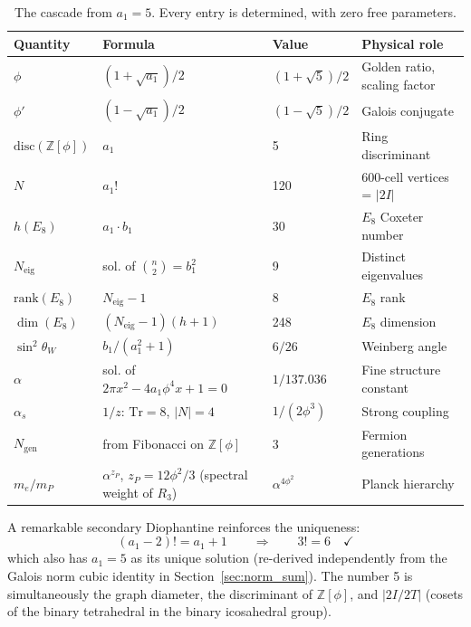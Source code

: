 \documentclass[12pt,a4paper]{article}
\theoremstyle{definition}
\begin{document}
\begin{table}[H]
\centering
\begin{tabular}{llll}
\toprule
\textbf{Quantity} & \textbf{Formula} & \textbf{Value} & \textbf{Physical role} \\
\midrule
$\phi$ & $(1 + \sqrt{a_1})/2$ & $(1+\sqrt{5})/2$ & Golden ratio, scaling factor \\
$\phi'$ & $(1 - \sqrt{a_1})/2$ & $(1-\sqrt{5})/2$ & Galois conjugate \\
$\text{disc}(\mathbb{Z}[\phi])$ & $a_1$ & 5 & Ring discriminant \\
$N$ & $a_1!$ & 120 & 600-cell vertices = $|2I|$ \\
$h(E_8)$ & $a_1 \cdot b_1$ & 30 & $E_8$ Coxeter number \\
$N_{\text{eig}}$ & sol. of $\binom{n}{2} = b_1^2$ & 9 & Distinct eigenvalues \\
$\text{rank}(E_8)$ & $N_{\text{eig}} - 1$ & 8 & $E_8$ rank \\
$\dim(E_8)$ & $(N_{\text{eig}}-1)(h+1)$ & 248 & $E_8$ dimension \\
$\sin^2\theta_W$ & $b_1/(a_1^2+1)$ & $6/26$ & Weinberg angle \\
$\alpha$ & sol. of $2\pi x^2 - 4a_1\phi^4 x + 1 = 0$ & $1/137.036$ & Fine structure constant \\
$\alpha_s$ & $1/z$: $\text{Tr}=8$, $|N|=4$ & $1/(2\phi^3)$ & Strong coupling \\
$N_{\text{gen}}$ & from Fibonacci on $\mathbb{Z}[\phi]$ & 3 & Fermion generations \\
$m_e/m_P$ & $\alpha^{z_P}$, $z_P = 12\phi^2/3$ (spectral weight of $R_3$) & $\alpha^{4\phi^2}$ & Planck hierarchy \\
\bottomrule
\end{tabular}
\caption{The cascade from $a_1 = 5$. Every entry is determined, with zero free parameters.}
\label{tab:cascade}
\end{table}

A remarkable secondary Diophantine reinforces the uniqueness:
\begin{equation}
(a_1 - 2)! = a_1 + 1 \qquad \Longrightarrow \qquad 3! = 6 \quad \checkmark
\label{eq:secondary_dioph}
\end{equation}
which also has $a_1 = 5$ as its unique solution (re-derived independently from the Galois norm cubic identity in Section~\ref{sec:norm_sum}). The number 5 is simultaneously the graph diameter, the discriminant of $\mathbb{Z}[\phi]$, and $|2I/2T|$ (cosets of the binary tetrahedral in the binary icosahedral group).
\end{document}
